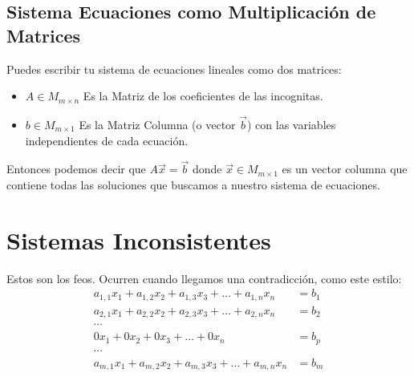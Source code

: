 \documentclass[12pt, fleqn]{report}                             %
\theoremstyle{break}                                            %
\begin{document}
            \clearpage
            \subsection{Sistema Ecuaciones como Multiplicación de Matrices}

                Puedes escribir tu sistema de ecuaciones lineales como dos matrices:
                \begin{itemize}
                    \item $A \in M_{m \times n}$ Es la Matriz de los coeficientes de las incognitas.

                    \item $b \in M_{m \times 1}$ Es la Matriz Columna (o vector $\vec{b}$) con las variables 
                        independientes de cada ecuación.
                \end{itemize}

                Entonces podemos decir que $A \vec x = \vec b$ donde $\vec x \in M_{m \times 1}$ es un vector columna
                que contiene todas las soluciones que buscamos a nuestro sistema de ecuaciones.




        \clearpage
        \section{Sistemas Inconsistentes}

            Estos son los feos.
            Ocurren cuando llegamos una contradicción, como este estilo:
            \begin{align*}
                a_{1,1}x_1 + a_{1,2}x_2 + a_{1,3}x_3 + \dots + a_{1,n}x_n &= b_1 \\
                a_{2,1}x_1 + a_{2,2}x_2 + a_{2,3}x_3 + \dots + a_{2,n}x_n &= b_2 \\
               \cdots                                                            \\
                0x_1       + 0x_2       + 0x_3       + \dots + 0x_n       &= b_p \\
               \cdots                                                            \\
                a_{m,1}x_1 + a_{m,2}x_2 + a_{m,3}x_3 + \dots + a_{m,n}x_n &= b_m \\
            \end{align*}
\end{document}
